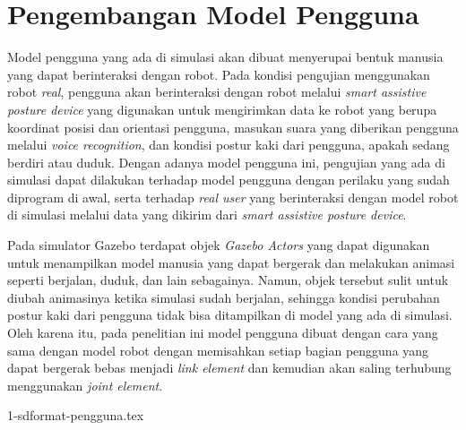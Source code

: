 \section{Pengembangan Model Pengguna}
\label{sec:modelpengguna}

Model pengguna yang ada di simulasi akan dibuat menyerupai bentuk manusia yang dapat berinteraksi dengan robot.
Pada kondisi pengujian menggunakan robot \emph{real},
  pengguna akan berinteraksi dengan robot melalui \emph{smart assistive posture device} yang digunakan untuk mengirimkan data ke robot yang berupa koordinat posisi dan orientasi pengguna,
  masukan suara yang diberikan pengguna melalui \emph{voice recognition},
  dan kondisi postur kaki dari pengguna, apakah sedang berdiri atau duduk.
Dengan adanya model pengguna ini,
  pengujian yang ada di simulasi dapat dilakukan terhadap model pengguna dengan perilaku yang sudah diprogram di awal,
  serta terhadap \emph{real user} yang berinteraksi dengan model robot di simulasi melalui data yang dikirim dari \emph{smart assistive posture device}.

Pada simulator Gazebo terdapat objek \emph{Gazebo Actors} yang dapat digunakan untuk menampilkan model manusia yang dapat bergerak dan melakukan animasi seperti berjalan, duduk, dan lain sebagainya.
Namun, objek tersebut sulit untuk diubah animasinya ketika simulasi sudah berjalan,
  sehingga kondisi perubahan postur kaki dari pengguna tidak bisa ditampilkan di model yang ada di simulasi.
Oleh karena itu, pada penelitian ini model pengguna dibuat dengan cara yang sama dengan model robot dengan memisahkan setiap bagian pengguna yang dapat bergerak bebas menjadi \emph{link element} dan kemudian akan saling terhubung menggunakan \emph{joint element}.

{1-sdformat-pengguna.tex}
